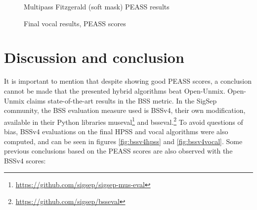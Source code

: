 \documentclass[letter,12pt]{article}
\begin{document}
\begin{figure}[ht]
	\centering
	\caption{Multipass Fitzgerald (soft mask) PEASS results}
	\label{fig:vocalround1soft}
	\vspace{1em}
	\caption{Final vocal results, PEASS scores}
	\label{fig:finalvocal}
\end{figure}

\vfill
\clearpage %

\section{Discussion and conclusion}

It is important to mention that despite showing good PEASS scores, a conclusion cannot be made that the presented hybrid algorithms beat Open-Unmix. Open-Unmix claims state-of-the-art results \cite{umxsota} in the BSS metric. In the SigSep community, the BSS evaluation measure used is BSSv4, their own modification, available in their Python libraries museval\footnote{\url{https://github.com/sigsep/sigsep-mus-eval}} and bsseval.\footnote{\url{https://github.com/sigsep/bsseval}} To avoid questions of bias, BSSv4 evaluations on the final HPSS and vocal algorithms were also computed, and can be seen in figures \ref{fig:bssv4hpss} and \ref{fig:bssv4vocal}. Some previous conclusions based on the PEASS scores are also observed with the BSSv4 scores:
\end{document}
